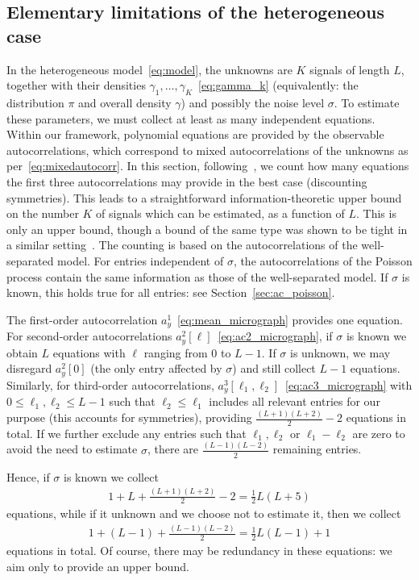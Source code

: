\documentclass[12pt]{article}
\newcommand{\1}{\mathbf{1}}
\theoremstyle{plain}
\theoremstyle{definition}
\theoremstyle{remark}
\theoremstyle{plain}
\theoremstyle{remark}
\theoremstyle{plain}
\theoremstyle{plain}
\theoremstyle{plain}
\numberwithin{equation}{section}
\begin{document}
\subsection{Elementary limitations of the heterogeneous case}
\label{sec:heterogeneity}



In the heterogeneous model~\eqref{eq:model}, the unknowns are $K$ signals of length $L$, together with their densities $\gamma_1, \ldots, \gamma_K$~\eqref{eq:gamma_k} (equivalently: the distribution $\pi$ and overall density $\gamma$) and possibly the noise level $\sigma$. To estimate these parameters, we must collect at least as many independent equations. Within our framework, polynomial equations are provided by the observable autocorrelations, which correspond to mixed autocorrelations of the unknowns as per~\eqref{eq:mixedautocorr}. In this section, following~\cite{boumal2017heterogeneous}, we count how many equations the first three autocorrelations may provide in the best case (discounting symmetries). This leads to a straightforward information-theoretic upper bound on the number $K$ of signals which can be estimated, as a function of $L$. This is only an upper bound, though a bound of the same type was shown to be tight in a similar setting~\cite{bandeira2017estimation}.
The counting is based on the autocorrelations of the well-separated model. For entries independent of $\sigma$, the autocorrelations of the Poisson process contain the same information as those of the well-separated model. If $\sigma$ is known, this holds true for all entries: see Section~\ref{sec:ac_poisson}.


The first-order autocorrelation $a_y^1$~\eqref{eq:mean_micrograph} provides one equation. For second-order autocorrelations $a_y^2[\ell]$~\eqref{eq:ac2_micrograph}, if $\sigma$ is known we obtain $L$ equations with $\ell$ ranging from 0 to $L-1$. If $\sigma$ is unknown, we may disregard $a_y^2[0]$ (the only entry affected by $\sigma$) and still collect $L-1$ equations. Similarly, for third-order autocorrelations, $a_y^3[\ell_1, \ell_2]$~\eqref{eq:ac3_micrograph} with $0 \leq \ell_1, \ell_2 \leq L-1$ such that $\ell_2 \leq \ell_1$ includes all relevant entries for our purpose (this accounts for symmetries), providing $\frac{(L+1)(L+2)}{2}-2$ equations in total. 
If we further exclude any entries such that $\ell_1, \ell_2$ or $\ell_1 - \ell_2$ are zero to avoid the need to estimate $\sigma$, there are $\frac{(L-1)(L-2)}{2}$ remaining entries.

Hence, if $\sigma$ is known we collect
\begin{align*}
	1 + L + \frac{(L+1)(L+2)}{2}-2 = \frac{1}{2} L (L+5)
\end{align*}
equations, while if it unknown and we choose not to estimate it, then we collect
\begin{align*}
	1 + (L-1) + \frac{(L-1)(L-2)}{2} = \frac{1}{2} L (L-1) + 1
\end{align*}
equations in total. Of course, there may be redundancy in these equations: we aim only to provide an upper bound. %
\end{document}
